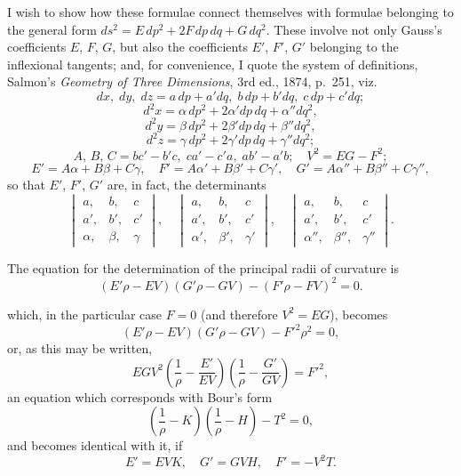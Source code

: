 \documentclass[11pt,a4paper]{article}
\begin{document}
I wish to show how these formulae connect themselves with formulae
belonging to the general form
$ds^{2}=E\,dp^{2}+2F\,dp\,dq+G\,dq^{2}$. These involve not only Gauss's
coefficients $E$, $F$, $G$, but also the coefficients $E'$, $F'$, $G'$
belonging to the inflexional tangents; and, for convenience, I quote
the system of definitions, Salmon's \textit{Geometry of Three
Dimensions}, 3rd ed., 1874, p.~251, viz.
\[
  dx,\;dy,\;dz=a\,dp+a'dq,\;b\,dp+b'dq,\;c\,dp+c'dq;
\]
\[
  d^{2}x=\alpha\,dp^{2}+2\alpha'dp\,dq+\alpha''dq^{2},
\]
\[
  d^{2}y=\beta\,dp^{2}+2\beta'dp\,dq+\beta''dq^{2},
\]
\[
  d^{2}z=\gamma\,dp^{2}+2\gamma'dp\,dq+\gamma''dq^{2};
\]
\[
  A,\,B,\,C=bc'-b'c,\;ca'-c'a,\;ab'-a'b;\quad V^{2}=EG-F^{2};
\]
\[
  E'=A\alpha+B\beta+C\gamma,\quad F'=A\alpha'+B\beta'+C\gamma',\quad G'=A\alpha''+B\beta''+C\gamma'',
\]
so that $E'$, $F'$, $G'$ are, in fact, the determinants
\[
  \begin{vmatrix} a,&b,&c\\ a',&b',&c'\\ \alpha,&\beta,&\gamma \end{vmatrix},\quad
  \begin{vmatrix} a,&b,&c\\ a',&b',&c'\\ \alpha',&\beta',&\gamma' \end{vmatrix},\quad
  \begin{vmatrix} a,&b,&c\\ a',&b',&c'\\ \alpha'',&\beta'',&\gamma'' \end{vmatrix}.
\]

The equation for the determination of the principal radii of curvature is
\[
  (E'\rho-EV)(G'\rho-GV)-(F'\rho-FV)^{2}=0.
\]

\newpage
\noindent
which, in the particular case $F=0$ (and therefore $V^{2}=EG$), becomes
\[
  (E'\rho-EV)(G'\rho-GV)-F'^{2}\rho^{2}=0,
\]
or, as this may be written,
\[
  EGV^{2}\!\left(\frac{1}{\rho}-\frac{E'}{EV}\right)\!\left(\frac{1}{\rho}-\frac{G'}{GV}\right)=F'^{2},
\]
an equation which corresponds with Bour's form
\[
  \left(\frac{1}{\rho}-K\right)\!\left(\frac{1}{\rho}-H\right)-T^{2}=0,
\]
and becomes identical with it, if
\[
  E'=EVK,\quad G'=GVH,\quad F'=-V^{2}T.
\]
\end{document}
